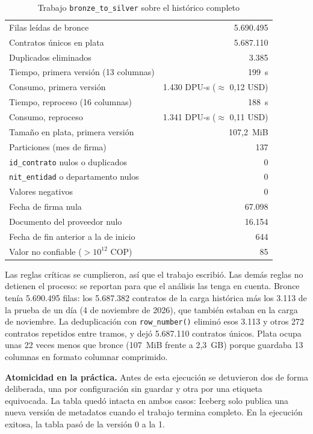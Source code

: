 \documentclass[conference]{IEEEtran}
\begin{document}
\begin{table}[htbp]
\caption{Trabajo \texttt{bronze\_to\_silver} sobre el histórico completo}
\label{tab:plata}
\centering
\begin{tabular}{@{}lr@{}}
\toprule
Filas leídas de bronce & 5.690.495 \\
Contratos únicos en plata & 5.687.110 \\
Duplicados eliminados & 3.385 \\
Tiempo, primera versión (13 columnas) & 199~s \\
Consumo, primera versión & 1.430 DPU-s ($\approx$ 0,12 USD) \\
Tiempo, reproceso (16 columnas) & 188~s \\
Consumo, reproceso & 1.341 DPU-s ($\approx$ 0,11 USD) \\
Tamaño en plata, primera versión & 107,2~MiB \\
Particiones (mes de firma) & 137 \\
\midrule
\texttt{id\_contrato} nulos o duplicados & 0 \\
\texttt{nit\_entidad} o departamento nulos & 0 \\
Valores negativos & 0 \\
Fecha de firma nula & 67.098 \\
Documento del proveedor nulo & 16.154 \\
Fecha de fin anterior a la de inicio & 644 \\
Valor no confiable ($> 10^{12}$ COP) & 85 \\
\bottomrule
\end{tabular}
\end{table}

Las reglas críticas se cumplieron, así que el trabajo escribió. Las demás reglas no detienen el proceso: se reportan para que el análisis las tenga en cuenta. Bronce tenía 5.690.495 filas: los 5.687.382 contratos de la carga histórica más los 3.113 de la prueba de un día (4 de noviembre de 2026), que también estaban en la carga de noviembre. La deduplicación con \texttt{row\_number()} eliminó esos 3.113 y otros 272 contratos repetidos entre tramos, y dejó 5.687.110 contratos únicos. Plata ocupa unas 22 veces menos que bronce (107~MiB frente a 2,3~GB) porque guardaba 13 columnas en formato columnar comprimido.

\textbf{Atomicidad en la práctica.} Antes de esta ejecución se detuvieron dos de forma deliberada, una por configuración sin guardar y otra por una etiqueta equivocada. La tabla quedó intacta en ambos casos: Iceberg solo publica una nueva versión de metadatos cuando el trabajo termina completo. En la ejecución exitosa, la tabla pasó de la versión 0 a la 1.
\end{document}
